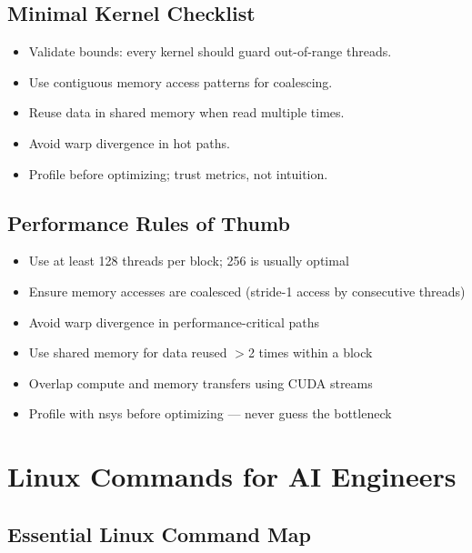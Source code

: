 \documentclass[10pt, oneside, openany]{book}
\begin{document}
\section*{Minimal Kernel Checklist}
\begin{itemize}
  \item Validate bounds: every kernel should guard out-of-range threads.
  \item Use contiguous memory access patterns for coalescing.
  \item Reuse data in shared memory when read multiple times.
  \item Avoid warp divergence in hot paths.
  \item Profile before optimizing; trust metrics, not intuition.
\end{itemize}

\section*{Performance Rules of Thumb}

\begin{itemize}
  \item Use at least 128 threads per block; 256 is usually optimal
  \item Ensure memory accesses are coalesced (stride-1 access by consecutive threads)
  \item Avoid warp divergence in performance-critical paths
  \item Use shared memory for data reused $>$2 times within a block
  \item Overlap compute and memory transfers using CUDA streams
  \item Profile with nsys before optimizing --- never guess the bottleneck
\end{itemize}

\chapter{Linux Commands for AI Engineers}
\label{app:linux}

\section*{Essential Linux Command Map}
\end{document}
